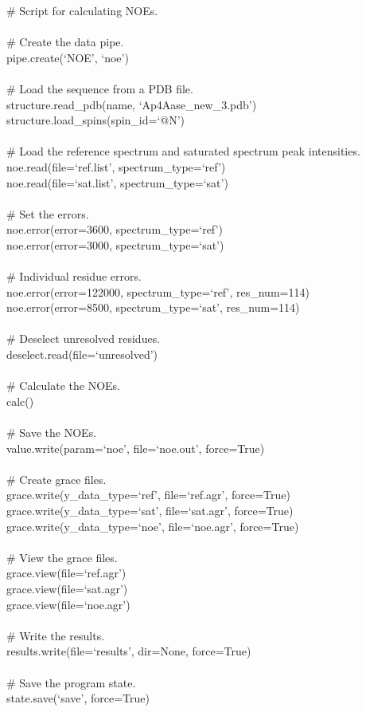\begin{exampleenv}
\# Script for calculating NOEs. \\
 \\
\# Create the data pipe. \\
pipe.create(`NOE', `noe') \\
 \\
\# Load the sequence from a PDB file. \\
structure.read\_pdb(name, `Ap4Aase\_new\_3.pdb') \\
structure.load\_spins(spin\_id=`@N') \\
 \\
\# Load the reference spectrum and saturated spectrum peak intensities. \\
noe.read(file=`ref.list', spectrum\_type=`ref') \\
noe.read(file=`sat.list', spectrum\_type=`sat') \\
 \\
\# Set the errors. \\
noe.error(error=3600, spectrum\_type=`ref') \\
noe.error(error=3000, spectrum\_type=`sat') \\
 \\
\# Individual residue errors. \\
noe.error(error=122000, spectrum\_type=`ref', res\_num=114) \\
noe.error(error=8500, spectrum\_type=`sat', res\_num=114) \\
 \\
\# Deselect unresolved residues. \\
deselect.read(file=`unresolved') \\
 \\
\# Calculate the NOEs. \\
calc() \\
 \\
\# Save the NOEs. \\
value.write(param=`noe', file=`noe.out', force=True) \\
 \\
\# Create grace files. \\
grace.write(y\_data\_type=`ref', file=`ref.agr', force=True) \\
grace.write(y\_data\_type=`sat', file=`sat.agr', force=True) \\
grace.write(y\_data\_type=`noe', file=`noe.agr', force=True) \\
 \\
\# View the grace files. \\
grace.view(file=`ref.agr') \\
grace.view(file=`sat.agr') \\
grace.view(file=`noe.agr') \\
 \\
\# Write the results. \\
results.write(file=`results', dir=None, force=True) \\
 \\
\# Save the program state. \\
state.save(`save', force=True)
\end{exampleenv}



